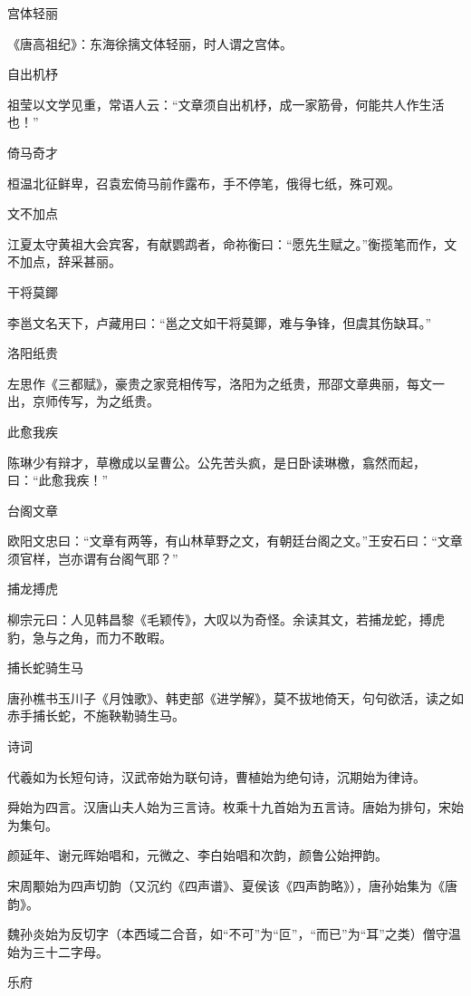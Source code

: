 \documentclass[a4paper,12pt,UTF8,twoside]{ctexbook}
\begin{document}
    宫体轻丽
    
    《唐高祖纪》：东海徐摛文体轻丽，时人谓之宫体。
    
    自出机杼
    
    祖莹以文学见重，常语人云：“文章须自出机杼，成一家筋骨，何能共人作生活也！”
    
    倚马奇才
    
    桓温北征鲜卑，召袁宏倚马前作露布，手不停笔，俄得七纸，殊可观。
    
    文不加点
    
    江夏太守黄祖大会宾客，有献鹦鹉者，命祢衡曰：“愿先生赋之。”衡揽笔而作，文不加点，辞采甚丽。
    
    干将莫鎁
    
    李邕文名天下，卢藏用曰：“邕之文如干将莫鎁，难与争锋，但虞其伤缺耳。”
    
    洛阳纸贵
    
    左思作《三都赋》，豪贵之家竞相传写，洛阳为之纸贵，邢邵文章典丽，每文一出，京师传写，为之纸贵。
    
    此愈我疾
    
    陈琳少有辩才，草檄成以呈曹公。公先苦头疯，是日卧读琳檄，翕然而起，曰：“此愈我疾！”
    
    台阁文章
    
    欧阳文忠曰：“文章有两等，有山林草野之文，有朝廷台阁之文。”王安石曰：“文章须官样，岂亦谓有台阁气耶？”
    
    捕龙搏虎
    
    柳宗元曰：人见韩昌黎《毛颖传》，大叹以为奇怪。余读其文，若捕龙蛇，搏虎豹，急与之角，而力不敢暇。
    
    捕长蛇骑生马
    
    唐孙樵书玉川子《月蚀歌》、韩吏部《进学解》，莫不拔地倚天，句句欲活，读之如赤手捕长蛇，不施鞅勒骑生马。
    
    诗词
    
    代羲如为长短句诗，汉武帝始为联句诗，曹植始为绝句诗，沉期始为律诗。
    
    舜始为四言。汉唐山夫人始为三言诗。枚乘十九首始为五言诗。唐始为排句，宋始为集句。
    
    颜延年、谢元晖始唱和，元微之、李白始唱和次韵，颜鲁公始押韵。
    
    宋周颙始为四声切韵（又沉约《四声谱》、夏侯该《四声韵略》），唐孙始集为《唐韵》。
    
    魏孙炎始为反切字（本西域二合音，如“不可”为“叵”，“而已”为“耳”之类）僧守温始为三十二字母。
    
    乐府
    
\end{document}
